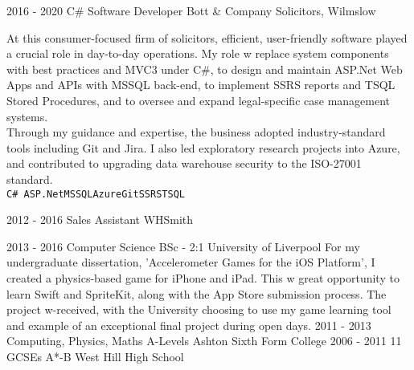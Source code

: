 \documentclass[8pt]{developercv} %
\begin{document}
\begin{entrylist}
\vspace{0.6cm}
    \entry
		{2016 - 2020}
		{C\# Software Developer}
		{Bott \& Company Solicitors, Wilmslow}
		{\raggedright At this consumer-focused firm of solicitors, efficient, user-friendly software played a crucial role in day-to-day operations. My role w replace system components with best practices and MVC3 under C\#, to design and maintain ASP.Net Web Apps and APIs with MSSQL back-end, to implement SSRS reports and TSQL Stored Procedures, and to oversee and expand legal-specific case management systems.\\\vspace{0.1cm}Through my guidance and expertise, the business adopted industry-standard tools including Git and Jira. I also led exploratory research projects into Azure, and contributed to upgrading data warehouse security to the ISO-27001 standard.\\\vspace{0.1cm}\texttt{C\# ASP.Net}\slashsep\texttt{MSSQL}\slashsep\texttt{Azure}\slashsep\texttt{Git}\slashsep\texttt{SSRS}\slashsep\texttt{TSQL}}

\vspace{0.6cm}
    \entry
		{2012 - 2016}
		{Sales Assistant}
		{WHSmith}
		{\raggedright }
\end{entrylist}



\begin{entrylist}
	\entry
		{2013 - 2016}
		{Computer Science BSc - 2:1}
		{University of Liverpool}
		{For my undergraduate dissertation, 'Accelerometer Games for the iOS Platform', I created a physics-based game for iPhone and iPad. This w great opportunity to learn Swift and SpriteKit, along with the App Store submission process. The project w-received, with the University choosing to use my game  learning tool and  example of an exceptional final project during open days.}
	\entry
		{2011 - 2013}
		{Computing, Physics, Maths A-Levels}
		{Ashton Sixth Form College}
		{}
	\entry
		{2006 - 2011}
		{11 GCSEs A*-B}
		{West Hill High School}
		{}
\end{entrylist}
\end{document}
